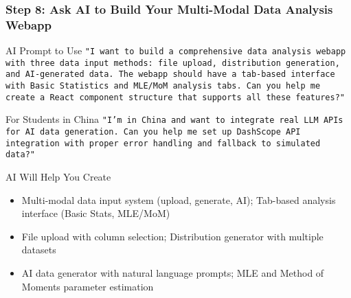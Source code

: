 \documentclass[aspectratio=169]{beamer}
\begin{document}
\begin{frame}
\frametitle{Step 8: Ask AI to Build Your Multi-Modal Data Analysis Webapp}
\begin{alertblock}{AI Prompt to Use}
\footnotesize
\texttt{"I want to build a comprehensive data analysis webapp with three data input methods: file upload, distribution generation, and AI-generated data. The webapp should have a tab-based interface with Basic Statistics and MLE/MoM analysis tabs. Can you help me create a React component structure that supports all these features?"}
\end{alertblock}

\begin{alertblock}{For Students in China}
\footnotesize
\texttt{"I'm in China and want to integrate real LLM APIs for AI data generation. Can you help me set up DashScope API integration with proper error handling and fallback to simulated data?"}
\end{alertblock}

\begin{exampleblock}{AI Will Help You Create}
\begin{itemize}
\footnotesize
\item Multi-modal data input system (upload, generate, AI); Tab-based analysis interface (Basic Stats, MLE/MoM)
\item File upload with column selection; Distribution generator with multiple datasets
\item AI data generator with natural language prompts;  MLE and Method of Moments parameter estimation
\end{itemize}
\end{exampleblock}
\end{frame}
\end{document}
